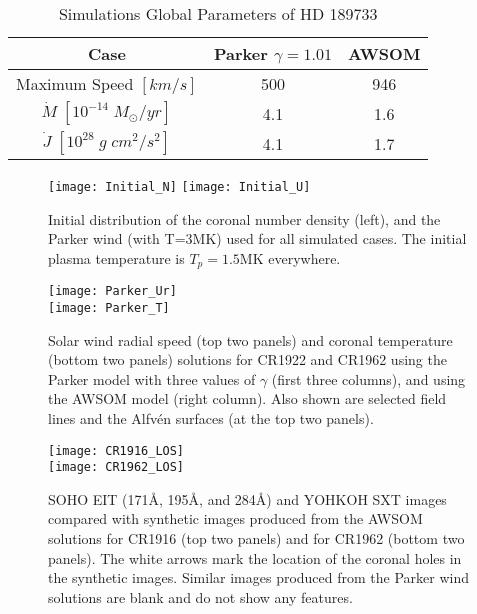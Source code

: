 \documentclass[apj]{emulateapj}
\begin{document}
\begin{table*}[h!]
\caption {Simulations Global Parameters of HD 189733} \label{tab:table2}
\centering
\begin{tabular}{ccc}
\hline
{\bf Case}&{\bf Parker $\gamma=1.01$} & {\bf AWSOM} \\
\hline
Maximum Speed $[km/s]$&500&946\\
$\dot{M}\;[10^{-14}\;M_\odot/yr]$&4.1&1.6\\
$\dot{J}\;[10^{28}\;g\;cm^2/s^2]$&4.1&1.7\\
\hline
\end{tabular}
\label{table:t2}
\end{table*}





\begin{figure*}[h!]
\centering
\texttt{[image: Initial\_N]}
\texttt{[image: Initial\_U]}
\caption{Initial distribution of the coronal number density (left), and the Parker wind (with T=3MK) used for all simulated cases. The initial plasma temperature is $T_p=1.5$MK everywhere.}
\label{fig:f1}
\end{figure*}

\begin{figure*}[h!]
\centering
\texttt{[image: Parker\_Ur]}\\
\texttt{[image: Parker\_T]}
\caption{Solar wind radial speed (top two panels) and coronal temperature (bottom two panels) solutions for CR1922 and CR1962 using the Parker model with three values of $\gamma$ (first three columns), and using the AWSOM model (right column). Also shown are selected field lines and the Alfv\'en surfaces (at the top two panels).}
\label{fig:f2}
\end{figure*}

\begin{figure*}[h!]
\centering
\texttt{[image: CR1916\_LOS]}\\
\texttt{[image: CR1962\_LOS]}
\caption{SOHO EIT (171\AA, 195\AA, and 284\AA) and YOHKOH SXT images compared with synthetic images produced from the AWSOM solutions for CR1916 (top two panels) and for CR1962 (bottom two panels). The white arrows mark the location of the coronal holes in the synthetic images. Similar images produced from the Parker wind solutions are blank and do not show any features.}
\label{fig:f3}
\end{figure*}
\end{document}
